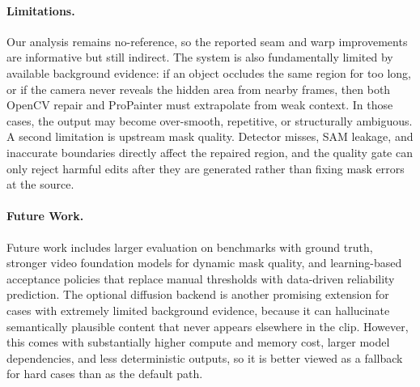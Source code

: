 \documentclass[10pt,twocolumn,letterpaper]{article}
\begin{document}
\paragraph{Limitations.}
Our analysis remains no-reference, so the reported seam and warp improvements are informative but still indirect. The system is also fundamentally limited by available background evidence: if an object occludes the same region for too long, or if the camera never reveals the hidden area from nearby frames, then both OpenCV repair and ProPainter must extrapolate from weak context. In those cases, the output may become over-smooth, repetitive, or structurally ambiguous. A second limitation is upstream mask quality. Detector misses, SAM leakage, and inaccurate boundaries directly affect the repaired region, and the quality gate can only reject harmful edits after they are generated rather than fixing mask errors at the source.

\paragraph{Future Work.}
Future work includes larger evaluation on benchmarks with ground truth, stronger video foundation models for dynamic mask quality, and learning-based acceptance policies that replace manual thresholds with data-driven reliability prediction. The optional diffusion backend is another promising extension for cases with extremely limited background evidence, because it can hallucinate semantically plausible content that never appears elsewhere in the clip. However, this comes with substantially higher compute and memory cost, larger model dependencies, and less deterministic outputs, so it is better viewed as a fallback for hard cases than as the default path.
\end{document}
